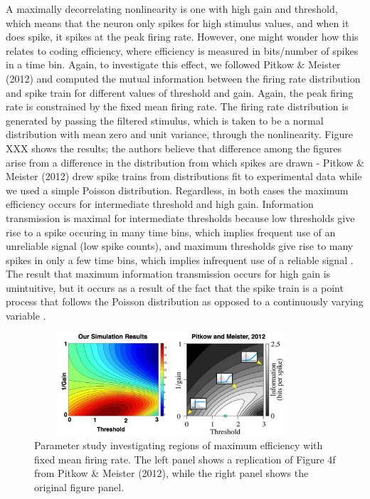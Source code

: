 \documentclass[12pt]{article}
\begin{document}
A maximally decorrelating nonlinearity is one with high gain and threshold, which means that the neuron only spikes for high stimulus values, and when it does spike, it spikes at the peak firing rate. However, one might wonder how this relates to coding efficiency, where efficiency is measured in bits/number of spikes in a time bin. Again, to investigate this effect, we followed Pitkow \& Meister (2012) and computed the mutual information between the firing rate distribution and spike train for different values of threshold and gain. Again, the peak firing rate is constrained by the fixed mean firing rate. The firing rate distribution is generated by passing the filtered stimulus, which is taken to be a normal distribution with mean zero and unit variance, through the nonlinearity. Figure XXX shows the results; the authors believe that difference among the figures arise from a difference in the distribution from which spikes are drawn - Pitkow \& Meister (2012) drew spike trains from distributions fit to experimental data while we used a simple Poisson distribution. Regardless, in both cases the maximum efficiency occurs for intermediate threshold and high gain. Information transmission is maximal for intermediate thresholds because low thresholds give rise to a spike occuring in many time bins, which implies frequent use of an unreliable signal (low spike counts), and maximum thresholds give rise to many spikes in only a few time bins, which implies infrequent use of a reliable signal \cite{Pitkow}. The result that maximum information transmission occurs for high gain is unintuitive, but it occurs as a result of the fact that the spike train is a point process that follows the Poisson distribution as opposed to a continuously varying variable \cite{Pitkow}. 


\begin{figure}[h!!]
\centerline{\includegraphics*[height = 1.5in,width=4.0in,angle=0]{ReplicationOf4f.pdf}}
\label{Figure 2}
\caption{Parameter study investigating regions of maximum efficiency with fixed mean firing rate. The left panel shows a replication of Figure 4f from Pitkow \& Meister (2012), while the right panel shows the original figure panel.}
\end{figure}
\end{document}
